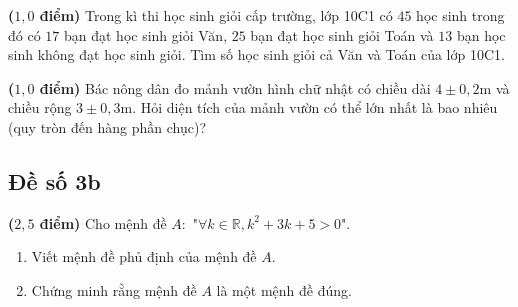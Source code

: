 \begin{bt}%
	\textbf{($1,0$ điểm)} Trong kì thi học sinh giỏi cấp trường, lớp 10C1 có $45$ học sinh trong đó có  $17$ bạn đạt học sinh giỏi Văn, $25$ bạn đạt học sinh giỏi Toán và $13$ bạn học sinh không đạt học sinh giỏi. Tìm số học sinh giỏi cả Văn và Toán của lớp 10C1.
\end{bt}

\begin{bt}%
	\textbf{($1,0$ điểm)} Bác nông dân đo mảnh vườn hình chữ nhật có chiều dài $4 \pm 0,2 \text{m}$ và chiều rộng $3\pm 0,3 \text{m}$. Hỏi diện tích của mảnh vườn có thể lớn nhất là bao nhiêu (quy tròn đến hàng phần chục)?
\end{bt}

\subsection{Đề số 3b}
\setcounter{bt}{0}

\begin{bt}%
	\textbf{($2,5$ điểm) }Cho mệnh đề $A:$ "$\forall k \in \mathbb{R}, k^2+3k+5>0$".
	\begin{enumerate}
		\item Viết mệnh đề phủ định của mệnh đề $A$.
		\item Chứng minh rằng mệnh đề $A$ là một mệnh đề đúng.
	\end{enumerate}
\end{bt}

